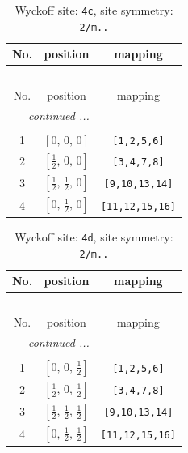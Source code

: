 \documentclass[fleqn,8pt]{jsarticle}
\begin{document}
\renewcommand{\arraystretch}{1.2}
\begin{longtable}{ccc}
\caption{Wyckoff site: {\tt 4c}, site symmetry: {\tt 2/m..}}
 \\
 \hline \hline
No. & position & mapping \\ \hline \endfirsthead

\multicolumn{2}{l}{\tablename\ \thetable{}} \\
 \hline \hline
No. & position & mapping \\ \hline \endhead

 \hline \hline
\multicolumn{2}{r}{\footnotesize\it continued ...} \\ \endfoot

 \hline \hline
\multicolumn{2}{r}{} \\ \endlastfoot

1 & $\left[ 0,\, 0,\, 0 \right]$ & {\tt [1,2,5,6]} \\ \hline
2 & $\left[ \frac{1}{2},\, 0,\, 0 \right]$ & {\tt [3,4,7,8]} \\ \hline
3 & $\left[ \frac{1}{2},\, \frac{1}{2},\, 0 \right]$ & {\tt [9,10,13,14]} \\ \hline
4 & $\left[ 0,\, \frac{1}{2},\, 0 \right]$ & {\tt [11,12,15,16]} \\
\end{longtable}
\renewcommand{\arraystretch}{1.2}
\begin{longtable}{ccc}
\caption{Wyckoff site: {\tt 4d}, site symmetry: {\tt 2/m..}}
 \\
 \hline \hline
No. & position & mapping \\ \hline \endfirsthead

\multicolumn{2}{l}{\tablename\ \thetable{}} \\
 \hline \hline
No. & position & mapping \\ \hline \endhead

 \hline \hline
\multicolumn{2}{r}{\footnotesize\it continued ...} \\ \endfoot

 \hline \hline
\multicolumn{2}{r}{} \\ \endlastfoot

1 & $\left[ 0,\, 0,\, \frac{1}{2} \right]$ & {\tt [1,2,5,6]} \\ \hline
2 & $\left[ \frac{1}{2},\, 0,\, \frac{1}{2} \right]$ & {\tt [3,4,7,8]} \\ \hline
3 & $\left[ \frac{1}{2},\, \frac{1}{2},\, \frac{1}{2} \right]$ & {\tt [9,10,13,14]} \\ \hline
4 & $\left[ 0,\, \frac{1}{2},\, \frac{1}{2} \right]$ & {\tt [11,12,15,16]} \\
\end{longtable}
\end{document}

